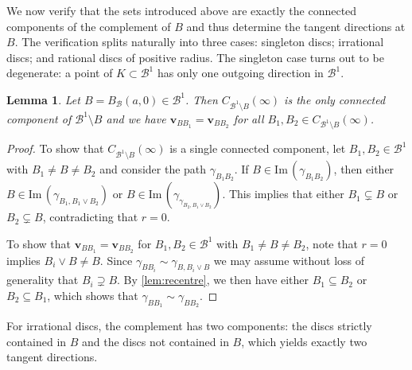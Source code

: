 \documentclass[10pt]{article}
\newtheorem{lemma}[theorem]{Lemma}
\theoremstyle{definition}
\renewcommand{\Im}{\mathrm{Im} \,}
\renewcommand{\vec}[1]{\mathbf{#1}}
\begin{document}
We now verify that the sets introduced above are exactly the connected components of the complement of $B$ and thus determine the tangent directions at $B$. The verification splits naturally into three cases: singleton discs; irrational discs; and rational discs of positive radius. The singleton case turns out to be degenerate: a point of \(K\subset \mathcal B^1\) has only one outgoing direction in \(\mathcal B^1\).

\begin{lemma}
  \label{lem:tangentDirections0}
  Let $B=B_{\mathcal{B}}(a,0)\in\mathcal B^1$.  Then $C_{\mathcal B^1\setminus B}(\infty)$ is the only connected component of $\mathcal B^1\setminus B$ and we have $\vec{v}_{BB_1}=\vec{v}_{BB_2}$ for all $B_1,B_2\in C_{\mathcal B^1\setminus B}(\infty)$.
\end{lemma}
\begin{proof}
  To show that $C_{\mathcal B^1\setminus B}(\infty)$ is a single connected component, let $B_1,B_2\in\mathcal B^1$ with $B_1\neq B\neq B_2$ and consider the path $\gamma_{B_1B_2}$.  If $B\in \Im(\gamma_{B_1B_2})$, then either $B\in \Im(\gamma_{B_1,B_1\vee B_2})$ or $B\in \Im(\gamma_{\gamma_{B_2,B_1\vee B_2}})$.  This implies that either $B_1\subsetneq B$ or $B_2\subsetneq B$, contradicting that $r=0$.

  To show that $\vec{v}_{BB_1}=\vec{v}_{BB_2}$ for $B_1,B_2\in\mathcal B^1$ with $B_1\neq B\neq B_2$, note that $r=0$ implies $B_i\vee B\neq B$.  Since $\gamma_{BB_i}\sim \gamma_{B,B_i\vee B}$ we may assume without loss of generality that $B_i\supsetneq B$.  By \cref{lem:recentre}, we then have either $B_1\subseteq B_2$ or $B_2\subseteq B_1$, which shows that $\gamma_{BB_1}\sim\gamma_{BB_2}$.
\end{proof}

For irrational discs, the complement has two components: the discs strictly contained in $B$ and the discs not contained in $B$, which yields exactly two tangent directions.
\end{document}
